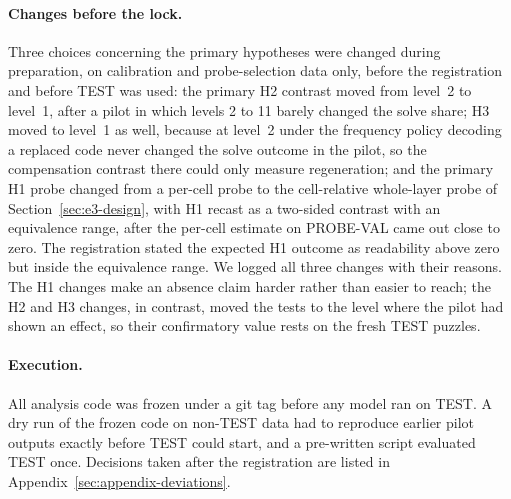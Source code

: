 \paragraph{Changes before the lock.} Three choices concerning the primary hypotheses were changed during preparation, on calibration and probe-selection data only, before the registration and before TEST was used: the primary H2 contrast moved from level~2 to level~1, after a pilot in which levels 2 to 11 barely changed the solve share; H3 moved to level~1 as well, because at level~2 under the frequency policy decoding a replaced code never changed the solve outcome in the pilot, so the compensation contrast there could only measure regeneration; and the primary H1 probe changed from a per-cell probe to the cell-relative whole-layer probe of Section~\ref{sec:e3-design}, with H1 recast as a two-sided contrast with an equivalence range, after the per-cell estimate on PROBE-VAL came out close to zero. The registration stated the expected H1 outcome as readability above zero but inside the equivalence range. We logged all three changes with their reasons. The H1 changes make an absence claim harder rather than easier to reach; the H2 and H3 changes, in contrast, moved the tests to the level where the pilot had shown an effect, so their confirmatory value rests on the fresh TEST puzzles.

\paragraph{Execution.} All analysis code was frozen under a git tag before any model ran on TEST. A dry run of the frozen code on non-TEST data had to reproduce earlier pilot outputs exactly before TEST could start, and a pre-written script evaluated TEST once. Decisions taken after the registration are listed in Appendix~\ref{sec:appendix-deviations}.
